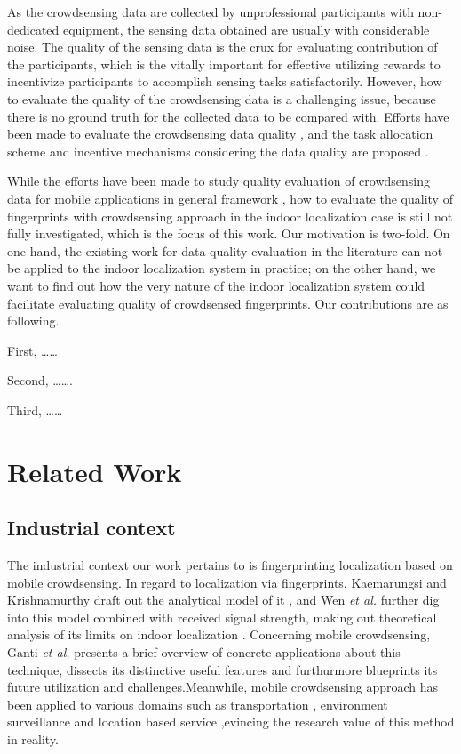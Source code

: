 \documentclass[10pt,conference,compsocconf,letterpaper]{IEEEtran}
\begin{document}
As the crowdsensing data are collected by unprofessional participants with non-dedicated equipment, the sensing data obtained are usually with considerable noise. The quality of the sensing data is the crux for evaluating contribution of the participants, which is the vitally important for effective utilizing rewards to incentivize participants to accomplish sensing tasks satisfactorily. However, how to evaluate the quality of the crowdsensing data is a challenging issue, because there is no ground truth for the collected data to be compared with. Efforts have been made to evaluate the crowdsensing data quality \cite{ Lbs2, Crowdloc14}, and the task allocation scheme \cite{ Taskselection15, recruit} and incentive mechanisms considering the data quality are proposed \cite{ Pengdan15, noise, incentive, Incentive2}. 

While the efforts have been made to study quality evaluation of crowdsensing data for mobile applications in general framework \cite{}, how to evaluate the quality of fingerprints with crowdsensing approach in the indoor localization case is still not fully investigated, which is the focus of this work. Our motivation is two-fold. On one hand, the existing work for data quality evaluation in the literature \cite{} can not be applied to the indoor localization system in practice; on the other hand, we want to find out how the very nature of the indoor localization system could facilitate evaluating quality of crowdsensed fingerprints. Our contributions are as following.

First, ……

Second, …….

Third, ……




\section{Related Work \label{sectionrelatedwork}}
\subsection{Industrial context}

The industrial context our work pertains to is fingerprinting localization based on mobile crowdsensing. In regard to localization via fingerprints, Kaemarungsi and Krishnamurthy draft out the analytical model of it \cite{kaemarungsi2004modeling}, and Wen \emph{et al.} further dig into this model combined with received signal strength, making out theoretical analysis of its limits on indoor localization \cite{wen2015fundamental}. Concerning mobile crowdsensing, Ganti \emph{et al.} presents a brief overview of concrete applications about this technique, dissects its distinctive useful features and furthurmore blueprints its future utilization and challenges\cite{ganti2011mobile}.Meanwhile, mobile crowdsensing approach has been applied to various domains such as transportation \cite{transportation2}, environment surveillance \cite{environment,environment2} and location based service \cite{lbs, lbs2},evincing the research value of this method in reality.
\end{document}
